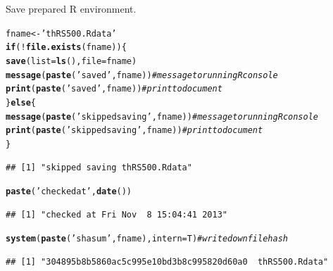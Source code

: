 \documentclass{article}\usepackage[]{graphicx}\usepackage[]{color}
\makeatletter
\newcommand{\hlstr}[1]{\textcolor[rgb]{0.192,0.494,0.8}{#1}}%
\newcommand{\hlcom}[1]{\textcolor[rgb]{0.678,0.584,0.686}{\textit{#1}}}%
\newcommand{\hlopt}[1]{\textcolor[rgb]{0,0,0}{#1}}%
\newcommand{\hlstd}[1]{\textcolor[rgb]{0.345,0.345,0.345}{#1}}%
\newcommand{\hlkwa}[1]{\textcolor[rgb]{0.161,0.373,0.58}{\textbf{#1}}}%
\newcommand{\hlkwb}[1]{\textcolor[rgb]{0.69,0.353,0.396}{#1}}%
\newcommand{\hlkwc}[1]{\textcolor[rgb]{0.333,0.667,0.333}{#1}}%
\newcommand{\hlkwd}[1]{\textcolor[rgb]{0.737,0.353,0.396}{\textbf{#1}}}%
\newenvironment{kframe}{%
 \def\at@end@of@kframe{}%
 \ifinner\ifhmode%
  \def\at@end@of@kframe{\end{minipage}}%
  \begin{minipage}{\columnwidth}%
 \fi\fi%
 \def\FrameCommand##1{\hskip\@totalleftmargin \hskip-\fboxsep
 \colorbox{shadecolor}{##1}\hskip-\fboxsep
     \hskip-\linewidth \hskip-\@totalleftmargin \hskip\columnwidth}%
 \MakeFramed {\advance\hsize-\width
   \@totalleftmargin\z@ \linewidth\hsize
   \@setminipage}}%
 {\par\unskip\endMakeFramed%
 \at@end@of@kframe}
\newenvironment{knitrout}{}{} %
\makeatother
\begin{document}
Save prepared R environment.
\begin{knitrout}
\color{fgcolor}\begin{kframe}
\begin{alltt}
\hlstd{fname} \hlkwb{<-} \hlstr{'thRS500.Rdata'}
\hlkwa{if}\hlstd{(}\hlopt{!}\hlkwd{file.exists}\hlstd{(fname)) \{}
   \hlkwd{save}\hlstd{(}\hlkwc{list}\hlstd{=}\hlkwd{ls}\hlstd{(),}\hlkwc{file}\hlstd{=fname)}
   \hlkwd{message}\hlstd{(}\hlkwd{paste}\hlstd{(}\hlstr{'saved'}\hlstd{,fname))}  \hlcom{# message to running R console}
   \hlkwd{print}\hlstd{(}\hlkwd{paste}\hlstd{(}\hlstr{'saved'}\hlstd{,fname))}    \hlcom{# print to document}
\hlstd{\}} \hlkwa{else} \hlstd{\{}
   \hlkwd{message}\hlstd{(}\hlkwd{paste}\hlstd{(}\hlstr{'skipped saving'}\hlstd{,fname))} \hlcom{# message to running R console}
   \hlkwd{print}\hlstd{(}\hlkwd{paste}\hlstd{(}\hlstr{'skipped saving'}\hlstd{,fname))}   \hlcom{# print to document}
\hlstd{\}}
\end{alltt}
\begin{verbatim}
## [1] "skipped saving thRS500.Rdata"
\end{verbatim}
\begin{alltt}
\hlkwd{paste}\hlstd{(}\hlstr{'checked at'}\hlstd{,}\hlkwd{date}\hlstd{())}
\end{alltt}
\begin{verbatim}
## [1] "checked at Fri Nov  8 15:04:41 2013"
\end{verbatim}
\begin{alltt}
\hlkwd{system}\hlstd{(}\hlkwd{paste}\hlstd{(}\hlstr{'shasum'}\hlstd{,fname),}\hlkwc{intern}\hlstd{=T)}  \hlcom{# write down file hash}
\end{alltt}
\begin{verbatim}
## [1] "304895b8b5860ac5c995e10bd3b8c995820d60a0  thRS500.Rdata"
\end{verbatim}
\end{kframe}
\end{knitrout}
\end{document}
